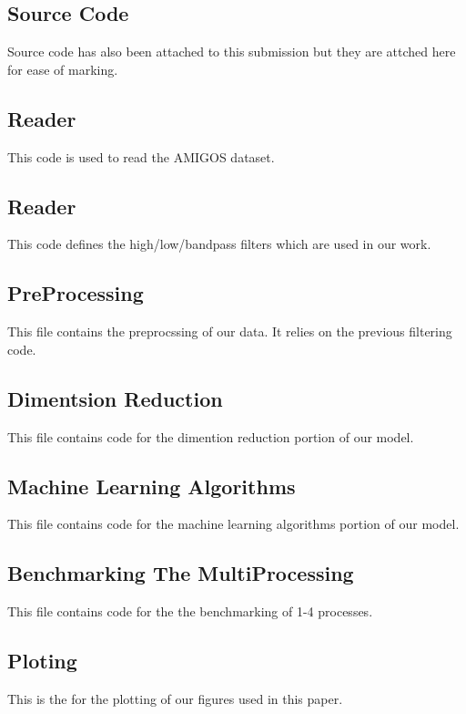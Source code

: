\clearpage
\onecolumn
\appendix
\begin{appendices}
  \section{Source Code}
  \noindent
  Source code has also been attached to this submission
  but they are attched here for ease of marking.

  \subsection{Reader}
  \noindent
  This code is used to read the AMIGOS dataset.
  

  \subsection{Reader}
  \noindent
  This code defines the high/low/bandpass filters
  which are used in our work.
  

  \subsection{PreProcessing}
  \noindent
  This file contains the preprocssing of our data.
  It relies on the previous filtering code.
  

  \subsection{Dimentsion Reduction}
  \noindent
  This file contains code for the dimention reduction portion of our model.
  

  \subsection{Machine Learning Algorithms}
  \noindent
  This file contains code for the machine learning algorithms portion of our model.
  

  \subsection{Benchmarking The MultiProcessing}
  \noindent
  This file contains code for the the benchmarking of 1-4 processes.
  

  \subsection{Ploting}
  \noindent
  This is the for the plotting of our figures used in this paper.
  

\end{appendices}
